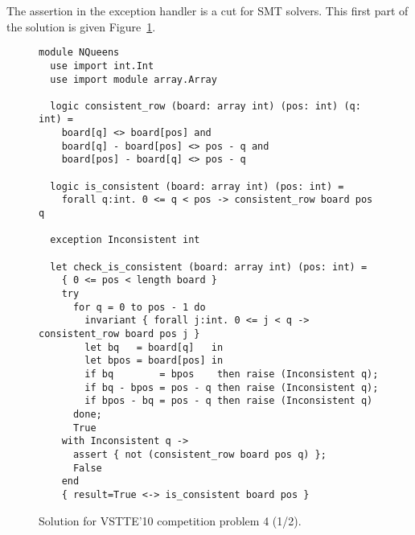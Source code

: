 The assertion in the exception handler is a cut for SMT solvers.
This first part of the solution is given Figure~\ref{fig:NQueens1}.
\begin{figure}
  \centering
\begin{verbatim}
module NQueens
  use import int.Int
  use import module array.Array

  logic consistent_row (board: array int) (pos: int) (q: int) =
    board[q] <> board[pos] and
    board[q] - board[pos] <> pos - q and
    board[pos] - board[q] <> pos - q

  logic is_consistent (board: array int) (pos: int) =
    forall q:int. 0 <= q < pos -> consistent_row board pos q

  exception Inconsistent int

  let check_is_consistent (board: array int) (pos: int) =
    { 0 <= pos < length board }
    try
      for q = 0 to pos - 1 do
        invariant { forall j:int. 0 <= j < q -> consistent_row board pos j }
        let bq   = board[q]   in
        let bpos = board[pos] in
        if bq        = bpos    then raise (Inconsistent q);
        if bq - bpos = pos - q then raise (Inconsistent q);
        if bpos - bq = pos - q then raise (Inconsistent q)
      done;
      True
    with Inconsistent q ->
      assert { not (consistent_row board pos q) };
      False
    end
    { result=True <-> is_consistent board pos }
\end{verbatim}
\vspace*{-2em}\hrulefill
  \caption{Solution for VSTTE'10 competition problem 4 (1/2).}
  \label{fig:NQueens1}
\end{figure}

